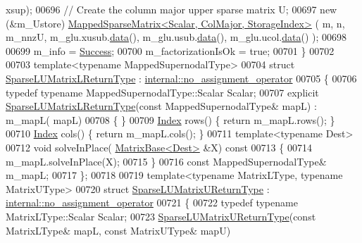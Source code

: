 \begin{DoxyCode}
      xsup); 
00696   \textcolor{comment}{// Create the column major upper sparse matrix  U; }
00697   \textcolor{keyword}{new} (&m\_Ustore) \hyperlink{class_eigen_1_1_mapped_sparse_matrix}{MappedSparseMatrix<Scalar, ColMajor, StorageIndex>}
       ( m, n, m\_nnzU, m\_glu.xusub.\hyperlink{class_eigen_1_1_plain_object_base_ac25699535374b1854cf8494e44ad31b2}{data}(), m\_glu.usub.\hyperlink{class_eigen_1_1_plain_object_base_ac25699535374b1854cf8494e44ad31b2}{data}(), m\_glu.ucol.\hyperlink{class_eigen_1_1_plain_object_base_ac25699535374b1854cf8494e44ad31b2}{data}() );
00698   
00699   m\_info = \hyperlink{group__enums_gga85fad7b87587764e5cf6b513a9e0ee5ea52581b035f4b59c203b8ff999ef5fcea}{Success};
00700   m\_factorizationIsOk = \textcolor{keyword}{true};
00701 \}
00702 
00703 \textcolor{keyword}{template}<\textcolor{keyword}{typename} MappedSupernodalType>
00704 \textcolor{keyword}{struct }\hyperlink{struct_eigen_1_1_sparse_l_u_matrix_l_return_type}{SparseLUMatrixLReturnType} : 
      \hyperlink{class_eigen_1_1internal_1_1no__assignment__operator}{internal::no\_assignment\_operator}
00705 \{
00706   \textcolor{keyword}{typedef} \textcolor{keyword}{typename} MappedSupernodalType::Scalar Scalar;
00707   \textcolor{keyword}{explicit} \hyperlink{struct_eigen_1_1_sparse_l_u_matrix_l_return_type}{SparseLUMatrixLReturnType}(\textcolor{keyword}{const} MappedSupernodalType& mapL) : m\_mapL(
      mapL)
00708   \{ \}
00709   \hyperlink{namespace_eigen_a62e77e0933482dafde8fe197d9a2cfde}{Index} rows() \{ \textcolor{keywordflow}{return} m\_mapL.rows(); \}
00710   \hyperlink{namespace_eigen_a62e77e0933482dafde8fe197d9a2cfde}{Index} cols() \{ \textcolor{keywordflow}{return} m\_mapL.cols(); \}
00711   \textcolor{keyword}{template}<\textcolor{keyword}{typename} Dest>
00712   \textcolor{keywordtype}{void} solveInPlace( \hyperlink{group___core___module_class_eigen_1_1_matrix_base}{MatrixBase<Dest>} &X)\textcolor{keyword}{ const}
00713 \textcolor{keyword}{  }\{
00714     m\_mapL.solveInPlace(X);
00715   \}
00716   \textcolor{keyword}{const} MappedSupernodalType& m\_mapL;
00717 \};
00718 
00719 \textcolor{keyword}{template}<\textcolor{keyword}{typename} MatrixLType, \textcolor{keyword}{typename} MatrixUType>
00720 \textcolor{keyword}{struct }\hyperlink{struct_eigen_1_1_sparse_l_u_matrix_u_return_type}{SparseLUMatrixUReturnType} : 
      \hyperlink{class_eigen_1_1internal_1_1no__assignment__operator}{internal::no\_assignment\_operator}
00721 \{
00722   \textcolor{keyword}{typedef} \textcolor{keyword}{typename} MatrixLType::Scalar Scalar;
00723   \hyperlink{struct_eigen_1_1_sparse_l_u_matrix_u_return_type}{SparseLUMatrixUReturnType}(\textcolor{keyword}{const} MatrixLType& mapL, \textcolor{keyword}{const} MatrixUType& mapU)

\end{DoxyCode}
